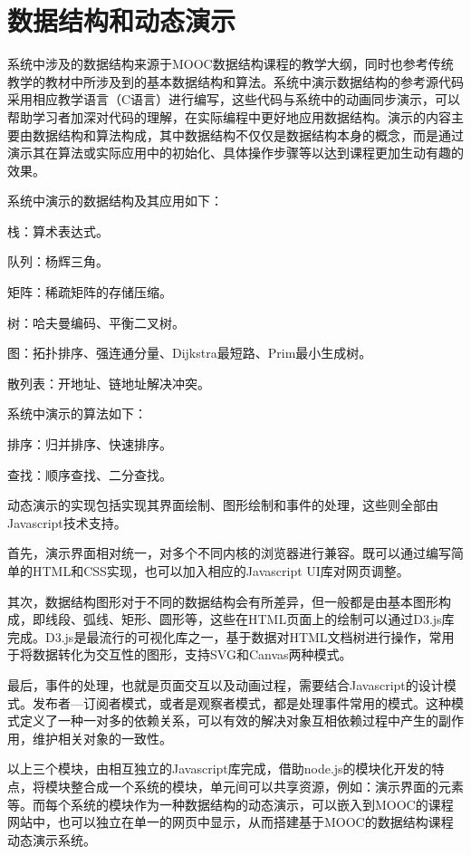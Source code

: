 \section{数据结构和动态演示}
\begin{sectext}
系统中涉及的数据结构来源于MOOC数据结构课程的教学大纲，同时也参考传统教学的教材中所涉及到的基本数据结构和算法。系统中演示数据结构的参考源代码采用相应教学语言（C语言）进行编写，这些代码与系统中的动画同步演示，可以帮助学习者加深对代码的理解，在实际编程中更好地应用数据结构。演示的内容主要由数据结构和算法构成，其中数据结构不仅仅是数据结构本身的概念，而是通过演示其在算法或实际应用中的初始化、具体操作步骤等以达到课程更加生动有趣的效果。

系统中演示的数据结构及其应用如下：
\begin{itemlist}
\item 栈：算术表达式。
\item 队列：杨辉三角。
\item 矩阵：稀疏矩阵的存储压缩。
\item 树：哈夫曼编码、平衡二叉树。
\item 图：拓扑排序、强连通分量、Dijkstra最短路、Prim最小生成树。
\item 散列表：开地址、链地址解决冲突。
\end{itemlist}

系统中演示的算法如下：
\begin{itemlist}
\item 排序：归并排序、快速排序。
\item 查找：顺序查找、二分查找。
\end{itemlist}

动态演示的实现包括实现其界面绘制、图形绘制和事件的处理，这些则全部由Javascript技术支持。

首先，演示界面相对统一，对多个不同内核的浏览器进行兼容。既可以通过编写简单的HTML和CSS实现，也可以加入相应的Javascript UI库对网页调整。

其次，数据结构图形对于不同的数据结构会有所差异，但一般都是由基本图形构成，即线段、弧线、矩形、圆形等，这些在HTML页面上的绘制可以通过D3.js库完成。D3.js是最流行的可视化库之一，基于数据对HTML文档树进行操作，常用于将数据转化为交互性的图形，支持SVG和Canvas两种模式。

最后，事件的处理，也就是页面交互以及动画过程，需要结合Javascript的设计模式。发布者—订阅者模式，或者是观察者模式，都是处理事件常用的模式。这种模式定义了一种一对多的依赖关系，可以有效的解决对象互相依赖过程中产生的副作用，维护相关对象的一致性。

以上三个模块，由相互独立的Javascript库完成，借助node.js的模块化开发的特点，将模块整合成一个系统的模块，单元间可以共享资源，例如：演示界面的元素等。而每个系统的模块作为一种数据结构的动态演示，可以嵌入到MOOC的课程网站中，也可以独立在单一的网页中显示，从而搭建基于MOOC的数据结构课程动态演示系统。
\end{sectext}
%
